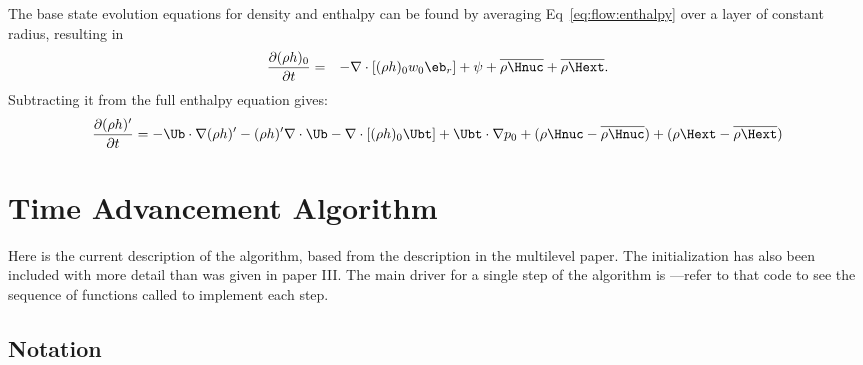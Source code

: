 The base state evolution equations for density and enthalpy can be
found by averaging Eq~\ref{eq:flow:enthalpy}
over a layer of constant radius, resulting in
\begin{eqnarray}
\frac{\partial(\rho h)_0}{\partial t} &=& -\nabla\cdot\left[(\rho h)_0w_0\eb_r\right] +
  \psi + \overline{\rho \Hnuc} + \overline{\rho \Hext}. \label{eq:flow:enthalpy_base}
\end{eqnarray}
Subtracting it from the full enthalpy equation gives:
\begin{equation}
\frac{\partial(\rho h)'}{\partial t} = -\Ub\cdot\nabla(\rho h)' - (\rho h)'\nabla\cdot\Ub - 
  \nabla\cdot\left[(\rho h)_0\Ubt\right] + \Ubt\cdot\nabla p_0 
   + ( \rho\Hnuc - \overline{\rho \Hnuc}) + (\rho\Hext - \overline{\rho \Hext}) 
\end{equation}




\section{Time Advancement Algorithm}\label{Sec:Time Advancement Algorithm}
Here is the current description of the algorithm, based from the
description in the multilevel paper.  The initialization has also been
included with more detail than was given in paper III.  The main
driver for a single step of the algorithm is ---refer
to that code to see the sequence of functions called to implement each
step.


\subsection{Notation}

